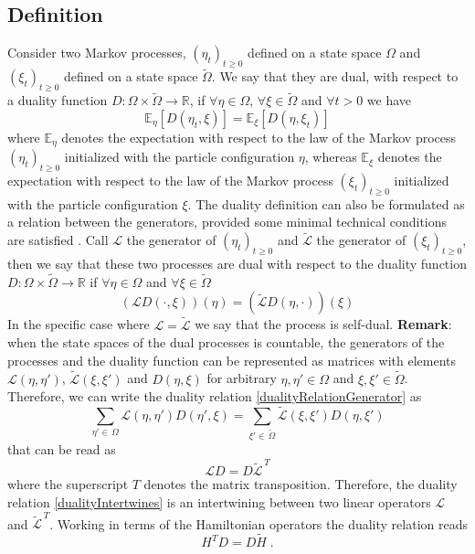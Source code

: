 \documentclass[10pt]{article}
\numberwithin{equation}{section}
\numberwithin{equation}{subsection}
\newcommand{\dt}{\;.}
\begin{document}
\subsection{Definition}
Consider two Markov processes, $(\eta_{t})_{t\geq 0}$ defined on a state space $\Omega$ and $(\xi_{t})_{t\geq 0}$ defined on a state space $\widetilde{\Omega}$. We say that they are dual, with respect to a duality function $D:\Omega\times \widetilde{\Omega}\to \mathbb{R}$, if $\forall \eta\in\Omega$, $\forall \xi\in\widetilde{\Omega}$ and $\forall t> 0$ we have 
\begin{equation}\label{duality-expectation}
    \mathbb{E}_{\eta}\left[D(\eta_{t},\xi)\right]=\mathbb{E}_{\xi}\left[D(\eta,\xi_{t})\right]
\end{equation}
where $\mathbb{E}_{\eta}$ denotes the expectation with respect to the law of the Markov process $(\eta_{t})_{t\geq 0}$ initialized with the particle configuration $\eta$, whereas $\mathbb{E}_{\xi}$ denotes the expectation with respect to the law of the Markov process $(\xi_{t})_{t\geq 0}$ initialized with the particle configuration $\xi$.
The duality definition can also be formulated as a relation between the generators, provided some minimal technical conditions are satisfied \cite{jansen2014notion}. Call $\mathcal{L}$ the generator of $(\eta_{t})_{t\geq0}$ and $\widetilde{\mathcal{L}}$ the generator of $(\xi_{t})_{t\geq 0}$, then we say that these two processes are dual with respect to the duality function $D:\Omega\times \widetilde{\Omega}\to \mathbb{R}$ if $\forall \eta\in\Omega$ and $\forall \xi\in\widetilde{\Omega}$
\begin{equation}\label{dualityRelationGenerator}
    \left(\mathcal{L}D(\cdot,\xi)\right)(\eta)=\left(\widetilde{\mathcal{L}}D(\eta,\cdot)\right)(\xi)
\end{equation}
In the specific case where $\mathcal{L}=\widetilde{\mathcal{L}}$ we say that the process is self-dual.
\newline
\newline
\textbf{Remark}:
when the state spaces of the dual processes is countable, the generators of the processes and the duality function can be represented as matrices with elements $\mathcal{L}(\eta,\eta')$, $\widetilde{\mathcal{L}}(\xi,\xi')$ and $D(\eta,\xi)$ for arbitrary $\eta,\eta'\in\Omega$ and $\xi,\xi'\in \widetilde{\Omega}$. Therefore, we can write the duality relation \eqref{dualityRelationGenerator} as 
\begin{equation}
    \sum_{\eta'\in\,\Omega}\mathcal{L}(\eta,\eta')D(\eta',\xi)=\sum_{\xi'\in\, \widetilde{\Omega}}\widetilde{\mathcal{L}}(\xi,\xi')D(\eta,\xi')
\end{equation}
that can be read as
\begin{equation}\label{dualityIntertwines}
    \mathcal{L}D=D\widetilde{\mathcal{L}}^{\,T}
\end{equation}
where the superscript $T$ denotes the matrix transposition. Therefore, the duality relation \eqref{dualityIntertwines} is an intertwining between two linear operators $\mathcal{L}$ and $\widetilde{\mathcal{L}}^{\,T}$. Working in terms of the Hamiltonian operators the duality relation reads 
\begin{equation}\label{DualityRelation}
    H^{T}D=D\widetilde{H}\dt
\end{equation}
\end{document}
